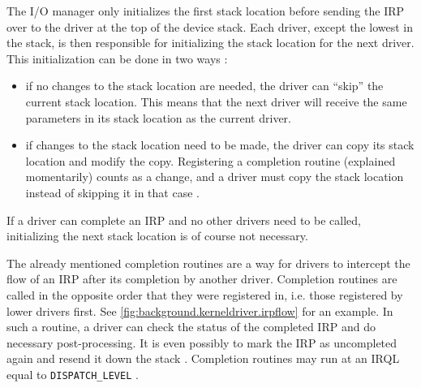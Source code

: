 The I/O manager only initializes the first stack location before sending the IRP over to the driver at the top of the device stack. Each driver, except the lowest in the stack, is then responsible for initializing the stack location for the next driver. This initialization can be done in two ways \cite{Yosifovich2017}:
\begin{itemize}
	\item if no changes to the stack location are needed, the driver can ``skip'' the current stack location. This means that the next driver will receive the same parameters in its stack location as the current driver.
	\item if changes to the stack location need to be made, the driver can copy its stack location and modify the copy. Registering a completion routine (explained momentarily) counts as a change, and a driver must copy the stack location instead of skipping it in that case \cite{Wdk}.
\end{itemize}
If a driver can complete an IRP and no other drivers need to be called, initializing the next stack location is of course not necessary.

The already mentioned completion routines are a way for drivers to intercept the flow of an IRP after its completion by another driver. Completion routines are called in the opposite order that they were registered in, i.e. those registered by lower drivers first. See \autoref{fig:background.kerneldriver.irpflow} for an example. In such a routine, a driver can check the status of the completed IRP and do necessary post-processing. It is even possibly to mark the IRP as uncompleted again and resend it down the stack \cite{Yosifovich2017}. Completion routines may run at an IRQL equal to \texttt{DISPATCH\_LEVEL} \cite{Wdk}.

